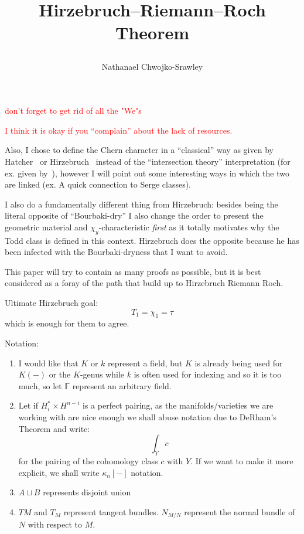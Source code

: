 \documentclass{book}
\title{
	\begin{huge}
		\bf{Hirzebruch–Riemann–Roch Theorem}
	\end{huge}
	}
\author{Nathanael Chwojko-Srawley}
\newcommand{\F}{{\mathbb{F}}}
\newcommand{\dcup}{\sqcup}
\begin{document}
\maketitle
\tableofcontents


\textcolor{red}{don't forget to get rid of all the "We"s}

\textcolor{red}{I think it is okay if you ``complain'' about the lack of resources.}

Also, I chose to define the Chern character in a ``classical'' way as given by
Hatcher~\cite{hatcherVectorBundlesKTheory2017} or Hirzebruch~\cite{hirzebruchTopologicalMethodsAlgebraic1995}
instead of the ``intersection theory'' interpretation (for ex. given by~\cite{fultonIntersectionTheory1984}),
however I will point out some interesting ways in which the two are linked (ex. A quick connection to Serge
classes).

I also do a fundamentally different thing from Hirzebruch: besides being the literal opposite of
``Bourbaki-dry'' I also change the order to present the geometric material and $\chi_y$-characteristic
\emph{first} as it totally motivates why the Todd class is defined in this context. Hirzebruch does the
opposite because he has been infected with the Bourbaki-dryness that I want to avoid.

This paper will try to contain as many proofs as possible, but it is best considered as a foray of the path
that build up to Hirzebruch Riemann Roch.

Ultimate Hirzebruch goal:
\[
  T_1 = \chi_1 = \tau
\]
which is enough for them to agree.

Notation:
\begin{enumerate}
  \item I would like that $K$ or $k$ represent a field, but $K$ is already being used for $K(-)$ or the
    $K$-genus while $k$ is often used for indexing and so it is too much, so let $\F$ represent an arbitrary
    field.
  \item Let if $H_i^* \times H^{n-i}$ is a perfect pairing, as the manifolds/varieties we are working with are
    nice enough we shall abuse notation due to DeRham's Theorem and write:
    \[
      \int_Y c
    \]
    for the pairing of the cohomology class $c$ with $Y$. If we want to make it more explicit, we shall write
    $\kappa_n[-]$ notation.
   \item $A\dcup B$ represents disjoint union
   \item $TM$ and $T_M$ represent tangent bundles. $N_{M/N}$ represent the normal bundle of $N$ with respect
     to $M$.
\end{enumerate}
\end{document}
